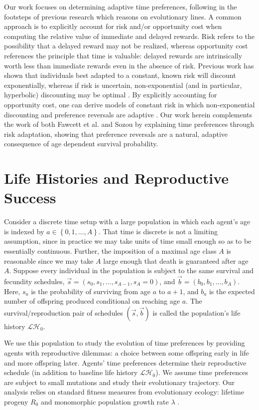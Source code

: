 \documentclass[titlepage, hidelinks, 12pt]{article}
\theoremstyle{plain}
\theoremstyle{remark}
\theoremstyle{definition}
\newcommand{\LH}{\mathcal{LH}}
\begin{document}
Our work focuses on determining adaptive time preferences, following in the footsteps of previous research which reasons on evolutionary
lines. A common approach is to explicitly account for risk and/or opportunity cost when computing the relative value of immediate and delayed
rewards. Risk refers to the possibility that a delayed reward may not be realized, whereas opportunity cost references the principle that
time is valuable: delayed rewards are intrinsically worth less than immediate rewards even in the absence of risk. 
Previous work has shown that individuals best adapted
to a constant, known risk will discount exponentially, whereas if risk is uncertain, non-exponential (and in particular,
hyperbolic) discounting may be optimal \cite{sozou98}. By explicitly accounting for opportunity cost, one can derive models of constant
risk in which non-exponential discounting and preference reversals are adaptive \cite{fawcett12}.
Our work herein complements the work of both Fawcett et al. and Sozou by 
explaining time preferences through risk adaptation, showing that preference reversals
are a natural, adaptive consequence of age dependent survival probability. 

\section{Life Histories and Reproductive Success}

Consider a discrete time setup with a large population
in which each agent's age is indexed by $a\in\left\{ 0, 1, \ldots, A \right\}$. That time is discrete is
not a limiting assumption, since in practice we may take units of time small enough so as to be essentially continuous. Further, 
the imposition of a maximal age class $A$ is reasonable since we may take $A$ large enough that death is guaranteed after
age $A$. Suppose every individual in the population is subject to the same survival and fecundity
schedules, $\vec{s} = (s_0, s_1, \ldots, s_{A-1}, s_A = 0)$, and $\vec{b} = (b_0, b_1, \ldots, b_A)$. Here, 
$s_a$ is the probability of surviving from age $a$ to $a+1$, and $b_a$ is the expected
number of offspring produced conditional on reaching age $a$. 
The survival/reproduction pair of schedules $(\vec{s}, \vec{b})$
is called the population's life history $\LH_0$. 

We use this population to study the evolution of time preferences by providing agents with reproductive dilemmas: a choice
between some offspring early in life and more offspring later. Agents' time preferences determine their reproductive schedule
(in addition to baseline life history $\LH_0$). We assume 
time preferences are subject to small mutations and study their evolutionary trajectory. Our analysis relies on 
standard fitness measures from evolutionary ecology: lifetime progeny $R_0$ and monomorphic population growth rate $\lambda$ 
\cite{stearns92}.
 
\end{document}
